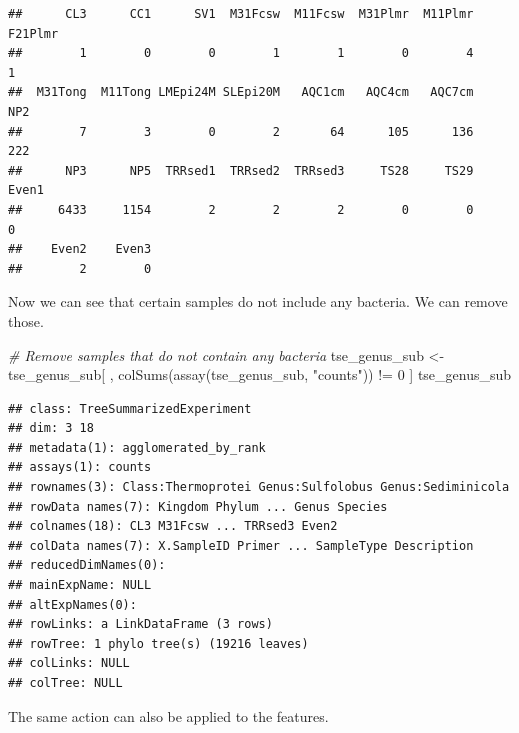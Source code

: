 \documentclass[
]{book}
\newenvironment{Shaded}{\begin{snugshade}}{\end{snugshade}}
\newcommand{\CommentTok}[1]{\textcolor[rgb]{0.56,0.35,0.01}{\textit{#1}}}
\newcommand{\DecValTok}[1]{\textcolor[rgb]{0.00,0.00,0.81}{#1}}
\newcommand{\FunctionTok}[1]{\textcolor[rgb]{0.00,0.00,0.00}{#1}}
\newcommand{\NormalTok}[1]{#1}
\newcommand{\OtherTok}[1]{\textcolor[rgb]{0.56,0.35,0.01}{#1}}
\newcommand{\SpecialCharTok}[1]{\textcolor[rgb]{0.00,0.00,0.00}{#1}}
\newcommand{\StringTok}[1]{\textcolor[rgb]{0.31,0.60,0.02}{#1}}
\begin{document}
\begin{verbatim}
##      CL3      CC1      SV1  M31Fcsw  M11Fcsw  M31Plmr  M11Plmr  F21Plmr 
##        1        0        0        1        1        0        4        1 
##  M31Tong  M11Tong LMEpi24M SLEpi20M   AQC1cm   AQC4cm   AQC7cm      NP2 
##        7        3        0        2       64      105      136      222 
##      NP3      NP5  TRRsed1  TRRsed2  TRRsed3     TS28     TS29    Even1 
##     6433     1154        2        2        2        0        0        0 
##    Even2    Even3 
##        2        0
\end{verbatim}

Now we can see that certain samples do not include any bacteria. We can remove those.

\begin{Shaded}
\begin{Highlighting}[]
\CommentTok{\# Remove samples that do not contain any bacteria}
\NormalTok{tse\_genus\_sub }\OtherTok{\textless{}{-}}\NormalTok{ tse\_genus\_sub[ , }\FunctionTok{colSums}\NormalTok{(}\FunctionTok{assay}\NormalTok{(tse\_genus\_sub, }\StringTok{"counts"}\NormalTok{)) }\SpecialCharTok{!=} \DecValTok{0}\NormalTok{ ]}
\NormalTok{tse\_genus\_sub}
\end{Highlighting}
\end{Shaded}

\begin{verbatim}
## class: TreeSummarizedExperiment 
## dim: 3 18 
## metadata(1): agglomerated_by_rank
## assays(1): counts
## rownames(3): Class:Thermoprotei Genus:Sulfolobus Genus:Sediminicola
## rowData names(7): Kingdom Phylum ... Genus Species
## colnames(18): CL3 M31Fcsw ... TRRsed3 Even2
## colData names(7): X.SampleID Primer ... SampleType Description
## reducedDimNames(0):
## mainExpName: NULL
## altExpNames(0):
## rowLinks: a LinkDataFrame (3 rows)
## rowTree: 1 phylo tree(s) (19216 leaves)
## colLinks: NULL
## colTree: NULL
\end{verbatim}

The same action can also be applied to the features.

\begin{Shaded}
\end{Shaded}
\end{document}
